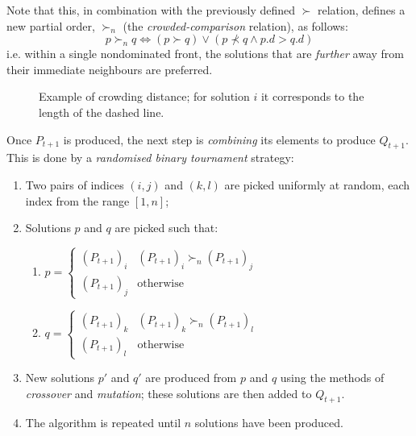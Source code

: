 \documentclass[12pt,a4paper,twoside,openright]{report}
\begin{document}
\noindent Note that this, in combination with the previously defined $\succ$ relation, defines a new partial order, $\succ_n$ (the \emph{crowded-comparison} relation), as follows:
\[p\succ_n q \iff (p \succ q) \vee (p \nprec q \wedge p.d > q.d)\]
i.e. within a single nondominated front, the solutions that are \emph{further} away from their immediate neighbours are preferred.
\begin{figure}[H]
\centering
{}
\caption[Example of crowding distance]{\centering Example of crowding distance; for solution $i$ it corresponds to the length of the dashed line.}\label{figcuboid}	
\end{figure}
\noindent Once $P_{t+1}$ is produced, the next step is \emph{combining} its elements to produce $Q_{t+1}$. This is done by a \emph{randomised binary tournament} strategy:
\begin{enumerate}
	\item Two pairs of indices $(i, j)$ and $(k, l)$ are picked uniformly at random, each index from the range $[1, n]$;
	\item Solutions $p$ and $q$ are picked such that:
	\begin{enumerate}
		\item $p = \begin{cases}(P_{t+1})_i & (P_{t+1})_i \succ_n (P_{t+1})_j\\(P_{t+1})_j & \text{otherwise}\end{cases}$
		\item $q = \begin{cases}(P_{t+1})_k & (P_{t+1})_k \succ_n (P_{t+1})_l\\(P_{t+1})_l & \text{otherwise}\end{cases}$
	\end{enumerate}
	\item New solutions $p'$ and $q'$ are produced from $p$ and $q$ using the methods of \emph{crossover} and \emph{mutation}; these solutions are then added to $Q_{t+1}$.
	\item The algorithm is repeated until $n$ solutions have been produced.
\end{enumerate}
\end{document}
